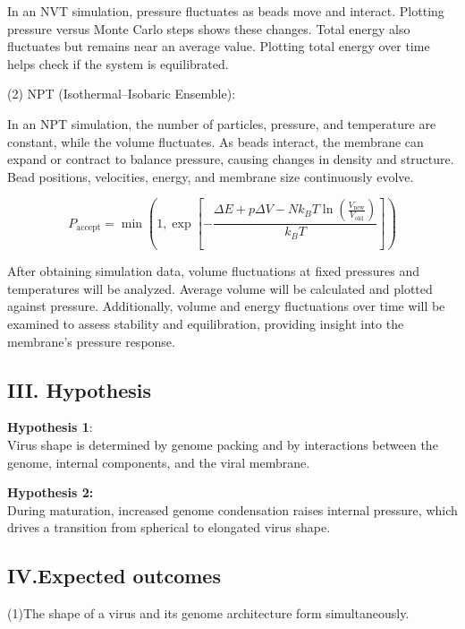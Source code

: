 \documentclass[12pt]{article}
\begin{document}
\begin{flushleft}
In an NVT simulation, pressure fluctuates as beads move and interact. Plotting pressure versus Monte Carlo steps shows these changes. Total energy also fluctuates but remains near an average value. Plotting total energy over time helps check if the system is equilibrated.
   
   

(2) NPT (Isothermal–Isobaric Ensemble): 

In an NPT simulation, the number of particles, pressure, and temperature are constant, while the volume fluctuates. As beads interact, the membrane can expand or contract to balance pressure, causing changes in density and structure. Bead positions, velocities, energy, and membrane size continuously evolve.
        
\begin{equation}
P_{\text{accept}} = \min \left( 1, \exp \left[ - \frac{\Delta E + p \Delta V - N k_B T \ln \left( \frac{V_{\text{new}}}{V_{\text{old}}} \right)}{k_B T} \right] \right)
\end{equation}
 
After obtaining simulation data, volume fluctuations at fixed pressures and temperatures will be analyzed. Average volume will be calculated and plotted against pressure. Additionally, volume and energy fluctuations over time will be examined to assess stability and equilibration, providing insight into the membrane’s pressure response. 



\vspace{-1em}
\subsection*{III. Hypothesis}


\noindent \textbf{Hypothesis 1}:\\
Virus shape is determined by genome packing and by interactions between the genome, internal components, and the viral membrane.


\noindent \textbf{Hypothesis 2:}\\
During maturation, increased genome condensation raises internal pressure, which drives a transition from spherical to elongated virus shape.


\vspace{-1em}

\subsection*{IV.Expected outcomes} 
(1)The shape of a virus and its genome architecture form simultaneously.
	

\end{flushleft}
\end{document}
